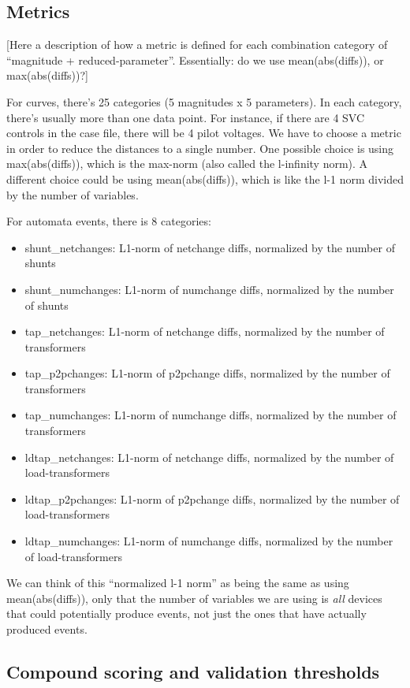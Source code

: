 \documentclass[11pt, a4paper, twoside, titlepage]{article}
\begin{document}
\subsection{Metrics}

[Here a description of how a metric is defined for each combination category of
  ``magnitude + reduced-parameter''. Essentially: do we use mean(abs(diffs)), or
  max(abs(diffs))?]

For curves, there's 25 categories (5 magnitudes x 5 parameters). In each
category, there's usually more than one data point. For instance, if there are 4
SVC controls in the case file, there will be 4 pilot voltages. We have to choose
a metric in order to reduce the distances to a single number. One possible
choice is using max(abs(diffs)), which is the max-norm (also called the
l-infinity norm).  A different choice could be using mean(abs(diffs)), which is
like the l-1 norm divided by the number of variables.


For automata events, there is 8 categories:
\begin{itemize}
\item shunt\_netchanges: L1-norm of netchange diffs, normalized by the number of shunts
\item shunt\_numchanges: L1-norm of numchange diffs, normalized by the number of shunts
\item tap\_netchanges: L1-norm of netchange diffs, normalized by the number of transformers
\item tap\_p2pchanges: L1-norm of p2pchange diffs, normalized by the number of transformers
\item tap\_numchanges:  L1-norm of numchange diffs, normalized by the number of transformers
\item ldtap\_netchanges:  L1-norm of netchange diffs, normalized by the number of load-transformers
\item ldtap\_p2pchanges: L1-norm of p2pchange diffs, normalized by the number of load-transformers
\item ldtap\_numchanges: L1-norm of numchange diffs, normalized by the number of load-transformers
\end{itemize}  

We can think of this ``normalized l-1 norm'' as being the same as using
mean(abs(diffs)), only that the number of variables we are using is \emph{all}
devices that could potentially produce events, not just the ones that have
actually produced events.


\subsection{Compound scoring and validation thresholds}
\end{document}
